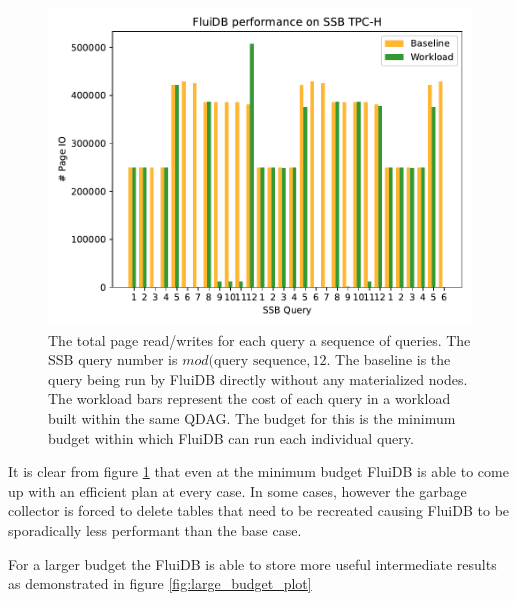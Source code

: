 \begin{figure}[p]
\centering
\includegraphics[width=.9\linewidth]{./plans/io_perf_22000.pdf}
\caption{\label{fig:min_budget_plot}
  The total page read/writes for each query a sequence of queries. The
  SSB query number is \(mod(\text{query sequence},12\). The baseline
  is the query being run by FluiDB directly without any materialized
  nodes. The workload bars represent the cost of each query in a
  workload built within the same QDAG. The budget for this is the
  minimum budget within which FluiDB can run each individual query.}
\end{figure}

It is clear from figure \ref{fig:min_budget_plot} that even at the minimum budget
FluiDB is able to come up with an efficient plan at every case. In
some cases, however the garbage collector is forced to delete tables
that need to be recreated causing FluiDB to be sporadically less
performant than the base case.

For a larger budget the FluiDB is able to store more useful
intermediate results as demonstrated in figure \ref{fig:large_budget_plot}

